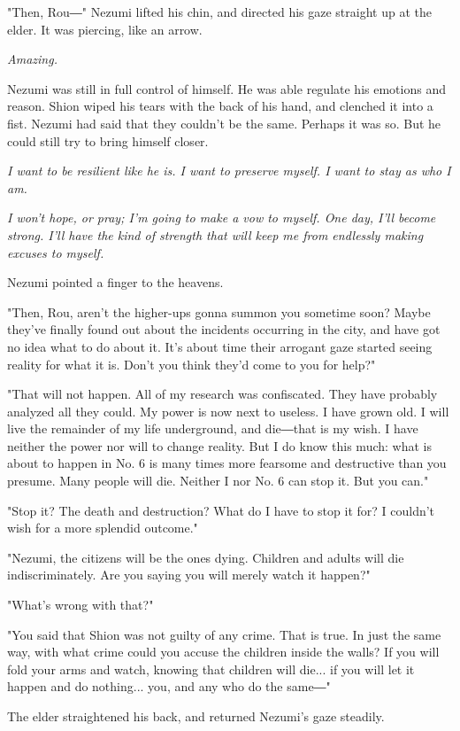 "Then, Rou―" Nezumi lifted his chin, and directed his gaze straight up
at the elder. It was piercing, like an arrow.

\emph{Amazing.}

Nezumi was still in full control of himself. He was able regulate his
emotions and reason. Shion wiped his tears with the back of his hand,
and clenched it into a fist. Nezumi had said that they couldn't be the
same. Perhaps it was so. But he could still try to bring himself closer.

\emph{I want to be resilient like he is. I want to preserve myself. I want to
	stay as who I am.}

\emph{I won't hope, or pray; I'm going to make a vow to myself. One day, I'll
	become strong. I'll have the kind of strength that will keep me from
	endlessly making excuses to myself.}

Nezumi pointed a finger to the heavens.

"Then, Rou, aren't the higher-ups gonna summon you sometime soon? Maybe
they've finally found out about the incidents occurring in the city, and
have got no idea what to do about it. It's about time their arrogant
gaze started seeing reality for what it is. Don't you think they'd come
to you for help?"

"That will not happen. All of my research was confiscated. They have
probably analyzed all they could. My power is now next to useless. I
have grown old. I will live the remainder of my life underground, and
die―that is my wish. I have neither the power nor will to change
reality. But I do know this much: what is about to happen in No. 6 is
many times more fearsome and destructive than you presume. Many people
will die. Neither I nor No. 6 can stop it. But you can."

"Stop it? The death and destruction? What do I have to stop it for? I
couldn't wish for a more splendid outcome."

"Nezumi, the citizens will be the ones dying. Children and adults will
die indiscriminately. Are you saying you will merely watch it happen?"

"What's wrong with that?"

"You said that Shion was not guilty of any crime. That is true. In just
the same way, with what crime could you accuse the children inside the
walls? If you will fold your arms and watch, knowing that children will
die... if you will let it happen and do nothing... you, and any who do
the same―"

The elder straightened his back, and returned Nezumi's gaze steadily.

